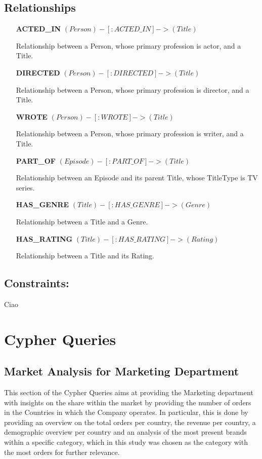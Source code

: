 \documentclass[a4paper,12pt]{article}
\begin{document}
\subsection{Relationships}
\begin{itemize}[noitemsep]
  
    \item[\textbf{ACTED\_IN}] $(Person)-[:ACTED\_IN]->(Title)$
    
    Relationship between a Person, whose primary profession is actor, and a Title.
    \item[\textbf{DIRECTED}] $(Person)-[:DIRECTED]->(Title)$
    
    Relationship between a Person, whose primary profession is director, and a Title.
    \item[\textbf{WROTE}] $(Person)-[:WROTE]->(Title)$
    
    Relationship between a Person, whose primary profession is writer, and a Title.
    \item[\textbf{PART\_OF}] $(Episode)-[:PART\_OF]->(Title)$
    
    Relationship between an Episode and its parent Title, whose TitleType is TV series.
    \item[\textbf{HAS\_GENRE}] $(Title)-[:HAS\_GENRE]->(Genre)$
    
    Relationship between a Title and a Genre.
    \item[\textbf{HAS\_RATING}] $(Title)-[:HAS\_RATING]->(Rating)$
    
    Relationship between a Title and its Rating.

    
\end{itemize}


\subsection{Constraints:}
Ciao
\section{Cypher Queries}
\subsection{Market Analysis for Marketing Department}
This section of the Cypher Queries aims at providing the Marketing department with insights on the share within the market by providing the number of orders in the Countries in which the Company operates.
In particular, this is done by providing an overview on the total orders per country, the revenue per country, a demographic overview per country and an analysis of the most present brands within a specific 
category, which in this study was chosen as the category with the most orders for further relevance.
\end{document}
